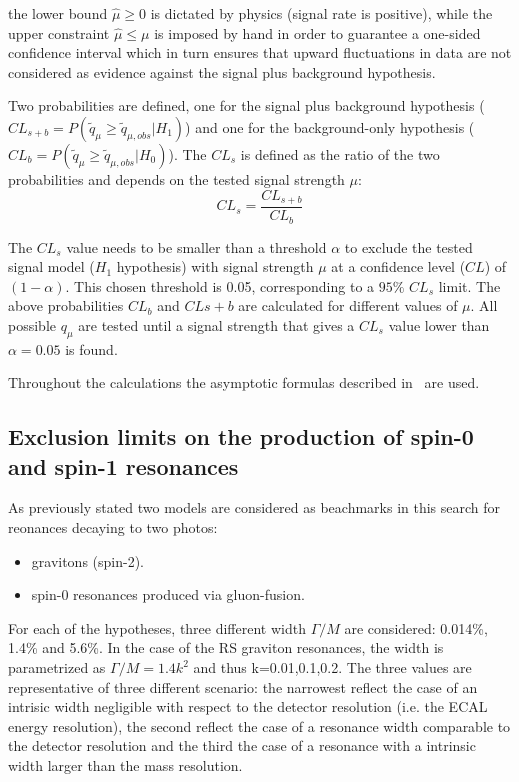the lower bound $\hat\mu \geq 0$ is  dictated  by  physics  (signal  rate  is  positive),  while
the upper constraint $\hat\mu \leq \mu$ is imposed by hand in order to guarantee a one-sided
confidence interval which in turn ensures that upward fluctuations in data are not considered as
evidence against the signal plus background hypothesis.

Two probabilities are defined, one for the signal plus background hypothesis
($CL_{s+b} = P( \tilde{q}_{\mu} \geq \tilde{q}_{\mu,obs} |H_1 )$) and
one for the background-only hypothesis ($CL_b = P( \tilde{q}_{\mu} \geq \tilde{q}_{\mu,obs} |H_0 )$). The $CL_s$ is defined
as the ratio of the two probabilities and depends on the tested signal strength $\mu$:
\[
  CL_s = \frac{CL_{s+b}}{CL_b}
\]

The $CL_s$ value needs to be smaller than a threshold $\alpha$ to exclude the tested signal model ($H_1$ hypothesis) 
with signal strength $\mu$ at a confidence level ($CL$) of $(1-\alpha)$. This chosen threshold is 0.05,
corresponding to a $95\%$ $CL_s$ limit. The above probabilities $CL_b$ and $CL{s+b}$
are calculated for different values of $\mu$. All possible $q_{\mu}$ are tested until a signal strength
that gives a $CL_s$ value lower than $\alpha = 0.05$ is found.

Throughout the calculations the asymptotic formulas described in~\cite{Cowan:2010js} are used.

\clearpage
\subsection{Exclusion limits on the production of spin-0 and spin-1 resonances}
As previously stated two models are considered as beachmarks in this search for reonances decaying to two photos:
\begin{itemize}
\item \RS gravitons (spin-2).
\item spin-0 resonances produced via gluon-fusion.
\end{itemize}

For each of the hypotheses, three different width $\Gamma / M$ are considered:
0.014\%, 1.4\% and 5.6\%. In the case of the RS graviton resonances, the width is
parametrized as $\Gamma / M = 1.4 k^2$ and thus k=0.01,0.1,0.2. The three values are representative of
three different scenario: the narrowest reflect the case of an intrisic width negligible with respect to the
detector resolution (i.e. the ECAL energy resolution), the second reflect the case of a resonance width
comparable to the detector resolution and the third the case of a resonance with a intrinsic width larger than
the mass resolution.

